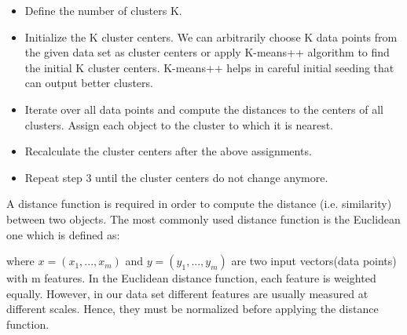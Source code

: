\begin{itemize}
	\item Define the number of clusters K.
	
	\item Initialize the K cluster centers. We can arbitrarily choose K data points from the given data set as cluster centers or apply K-means++ \cite{arthur2007k} algorithm to find the initial K cluster centers. K-means++ helps in careful initial seeding that can output better clusters.
	
	\item Iterate over all data points and compute the distances to the centers of all clusters. Assign each object to the cluster to which it is nearest.
	
	\item Recalculate the cluster centers after the above assignments.
	
	\item Repeat step 3 until the cluster centers do not change anymore.
\end{itemize}

A distance function is required in order to compute the
distance (i.e. similarity) between two objects. The most commonly used distance function is the Euclidean one which is defined as:
\begin{center}
\end{center}
where $x = (x_1, ..., x_m)$ and $y = (y_1, ..., y_m)$ are two input vectors(data points) with m features. In the Euclidean distance function, each feature is weighted equally. However, in our data set different features are usually measured at different scales. Hence, they must be normalized before applying the distance function.